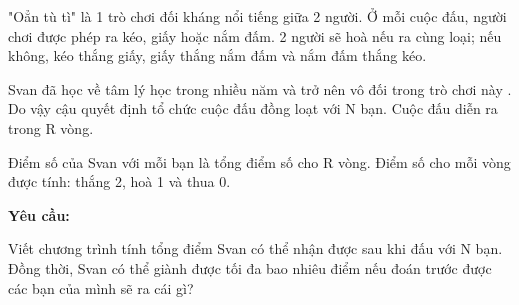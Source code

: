 "Oẳn tù tì" là 1 trò chơi đối kháng nổi tiếng giữa 2 người. Ở mỗi cuộc đấu, người chơi được phép ra kéo, giấy hoặc nắm đấm. 2 người sẽ hoà nếu ra cùng loại; nếu không, kéo thắng giấy, giấy thắng nắm đấm và nắm đấm thắng kéo.

Svan đã học về tâm lý học trong nhiều năm và trở nên vô đối trong trò chơi này . Do vậy cậu quyết định tổ chức cuộc đấu đồng loạt với N bạn. Cuộc đấu diễn ra trong R vòng.

Điểm số của Svan với mỗi bạn là tổng điểm số cho R vòng. Điểm số cho mỗi vòng được tính: thắng 2, hoà 1 và thua 0.

\textbf{Yêu cầu:}

Viết chương trình tính tổng điểm Svan có thể nhận được sau khi đấu với N bạn. Đồng thời, Svan có thể giành được tối đa bao nhiêu điểm nếu đoán trước được các bạn của mình sẽ ra cái gì?